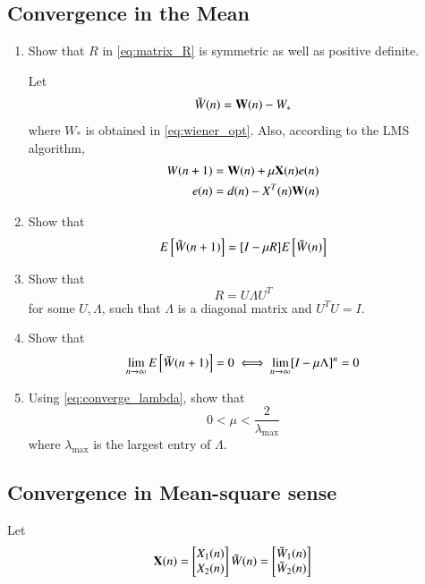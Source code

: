 \documentclass[journal,12pt,twocolumn]{IEEEtran}
\renewcommand\thesection{\arabic{section}}
\renewcommand\thesubsection{\thesection.\arabic{subsection}}
\begin{document}
\subsection{Convergence in the Mean}
\begin{enumerate}[label=\thesubsection.\arabic*
,ref=\thesubsection.\theenumi]

\item
Show that $R$ in \eqref{eq:matrix_R} is symmetric as well as positive definite.

%
Let
\begin{equation}
\tilde W(n)= \mathbf{W}(n) - W_{*}
\end{equation}
%
where $W_{*}$ is obtained in \eqref{eq:wiener_opt}. Also, according to the LMS algorithm,
\begin{align}
\label{eq:wn_update}
W(n+1)&=\mathbf{W}(n)+ \mu \mathbf{X}(n) e(n)
\\
e(n) &= d(n) - X^{T}(n)\mathbf{W}(n)
\end{align}
%
\item
%
Show that
\begin{equation}
 E{}\left[\tilde W(n+1)\right]=[I - \mu R]E{}\left[\tilde W(n)\right]
\end{equation}

\item
Show that 
\begin{equation}
\label{eq:eigen_decompose}
R = U \Lambda U^{T}
\end{equation}
%
for some $U, \Lambda$, such that $\Lambda$ is a diagonal matrix and $U^TU = I$.

%
\item
Show that
\begin{equation}
\label{eq:converge_lambda}
\lim_{n \to \infty}E{}\left[\tilde W(n+1)\right] = 0 \iff \lim_{n\to \infty}[I - \mu \Lambda]^n = 0
\end{equation}

%
\item
Using \eqref{eq:converge_lambda}, show that
\begin{equation}
0 < \mu < \frac{2}{\lambda_{\max}}
\end{equation}
%
where $\lambda_{\max}$ is the largest entry of $\Lambda$.
\end{enumerate}
%
\subsection{Convergence in Mean-square sense}
Let
\begin{equation}
 \mathbf{X}(n)
 =
  \begin{bmatrix}
   X_1(n) \\ X_2(n)  \end{bmatrix}\\
\tilde W(n)
 =
  \begin{bmatrix}
   \tilde W_1(n) \\ \tilde W_2(n) \end{bmatrix}
\end{equation}
\end{document}
